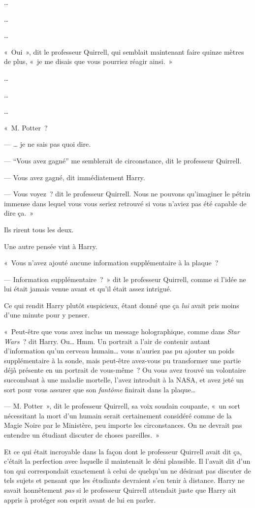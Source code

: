 …

…

…

«~Oui~», dit le professeur Quirrell, qui semblait maintenant faire quinze mètres de plus, «~je me disais que vous pourriez réagir ainsi.~»

…

…

…

«~M. Potter~?

--- … je ne sais pas quoi dire.

--- “Vous avez gagné” me semblerait de circonstance, dit le professeur Quirrell.

--- Vous avez gagné, dit immédiatement Harry.

--- Vous voyez~? dit le professeur Quirrell. Nous ne pouvons qu'imaginer le pétrin immense dans lequel vous vous seriez retrouvé si vous n'aviez pas été capable de dire ça.~»

Ils rirent tous les deux.

Une autre pensée vint à Harry.

«~Vous n'avez ajouté aucune information supplémentaire à la plaque~?

--- Information supplémentaire~?~» dit le professeur Quirrell, comme si l'idée ne lui était jamais venue avant et qu'il était assez intrigué.

Ce qui rendit Harry plutôt suspicieux, étant donné que ça \emph{lui} avait pris moins d'une minute pour y penser.

«~Peut-être que vous avez inclus un message holographique, comme dans \emph{Star Wars}~? dit Harry. Ou… Hmm. Un portrait a l'air de contenir autant d'information qu'un cerveau humain… vous n'auriez pas pu ajouter un poids supplémentaire à la sonde, mais peut-être avez-vous pu transformer une partie déjà présente en un portrait de vous-même~? Ou vous avez trouvé un volontaire succombant à une maladie mortelle, l'avez introduit à la NASA, et avez jeté un sort pour vous assurer que son \emph{fantôme} finirait dans la plaque…

--- M. Potter~», dit le professeur Quirrell, sa voix soudain coupante, «~un sort nécessitant la mort d'un humain serait certainement considéré comme de la Magie Noire par le Ministère, peu importe les circonstances. On ne devrait pas entendre un étudiant discuter de choses pareilles.~»

Et ce qui était incroyable dans la façon dont le professeur Quirrell avait dit ça, c'était la perfection avec laquelle il maintenait le déni plausible. Il l'avait dit d'un ton qui correspondait exactement à celui de quelqu'un ne désirant pas discuter de tels sujets et pensant que les étudiants devraient s'en tenir à distance. Harry ne savait honnêtement \emph{pas} si le professeur Quirrell attendait juste que Harry ait appris à protéger son esprit avant de lui en parler.

